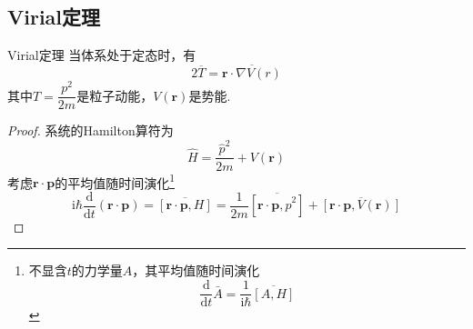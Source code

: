 \subsection{Virial定理}
\begin{question}{Virial定理}
    当体系处于定态时，有
    $$
        2\overline{T} = \overline{\boldsymbol{r}\cdot\nabla{V(r)}}
    $$
    其中$T=\dfrac{p^2}{2m}$是粒子动能，$V\left(\boldsymbol{r}\right)$是势能.
\end{question}
\begin{proof}
    系统的Hamilton算符为
    $$
        \hat{H}=\frac{\hat{p}^2}{2m}+V(\boldsymbol{r})
    $$
    考虑$\boldsymbol{r}\cdot\boldsymbol{p}$的平均值随时间演化\footnote{不显含$t$的力学量$A$，其平均值随时间演化
        $$
            \frac{\mathrm{d}}{\mathrm{d}t}\bar{A}=\frac{1}{\mathrm{i}\hbar}\overline{\left[A, H\right]}
        $$
    }
    $$
        \mathrm{i}\hbar\frac{\mathrm{d}}{\mathrm{d}t}(\boldsymbol{r}\cdot\boldsymbol{p})
        =\overline{\left[\boldsymbol{r}\cdot\boldsymbol{p}, H\right]}
        =\frac{1}{2m}\overline{\left[\boldsymbol{r}\cdot\boldsymbol{p}, \hat{p}^2\right]}+\overline{\left[\boldsymbol{r}\cdot\boldsymbol{p}, V(\boldsymbol{r})\right]}
    $$

\end{proof}
